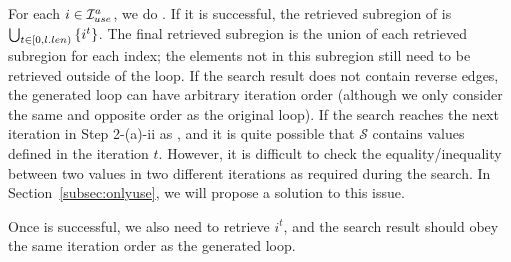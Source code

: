 For each $i\in \mathcal{I}^a_{use}$, we do .
If it is successful, the retrieved subregion of \AIn is $\bigcup_{t\in[0,l.len)}{\{i^t\}}$. 
The final retrieved subregion is the union of each retrieved subregion for each index;
the elements not in this subregion still need to be retrieved outside of the loop.
If the search result does not contain reverse edges, the generated loop can have arbitrary iteration order (although we only consider the same and opposite order as the original loop).
If the search reaches the next iteration in Step 2-(a)-ii as , and it is quite possible that $\mathcal{S}$ contains values defined in the iteration $t$.
However, it is difficult to check the equality/inequality between two values  in two different iterations as required during the search.
In Section~\ref{subsec:onlyuse}, we will propose a solution to this issue.

Once  is successful, we also need to retrieve $i^t$, and the search result should obey the same iteration order as the generated loop.




\begin{comment}
Using the similar method, we can also retrieve the output value of a loop from its input. 
If during \SearchVal{\AIn}{i^t}, there is no edge from the output of the iteration to the input of the iteration selected, then we can choose an arbitrary order of $t$ in $[0,\iternum)$ on \SearchVal{\AIn}{i^t}. Otherwise, the order of $t$ must be ascending from 0 to $\iternum-1$. 
\end{comment}




